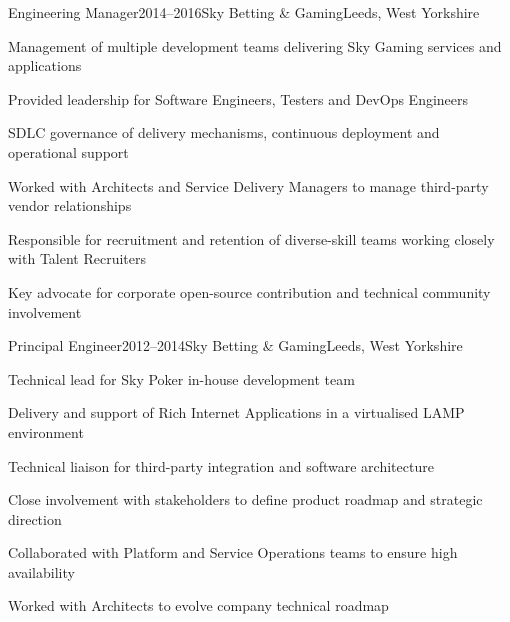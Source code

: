 \documentclass{cv}
\begin{document}

\begin{experience}{Engineering Manager}{2014--2016}{Sky Betting \& Gaming}{Leeds, West Yorkshire}
\item Management of multiple development teams delivering Sky Gaming services and applications
\item Provided leadership for Software Engineers, Testers and DevOps Engineers
\item SDLC governance of delivery mechanisms, continuous deployment and operational support
\item Worked with Architects and Service Delivery Managers to manage third-party vendor relationships
\item Responsible for recruitment and retention of diverse-skill teams working closely with Talent Recruiters
\item Key advocate for corporate open-source contribution and technical community involvement
\end{experience}


\begin{experience}{Principal Engineer}{2012--2014}{Sky Betting \& Gaming}{Leeds, West Yorkshire}
\item Technical lead for Sky Poker in-house development team
\item Delivery and support of Rich Internet Applications in a virtualised LAMP environment
\item Technical liaison for third-party integration and software architecture
\item Close involvement with stakeholders to define product roadmap and strategic direction
\item Collaborated with Platform and Service Operations teams to ensure high availability
\item Worked with Architects to evolve company technical roadmap
\end{experience}

\pagebreak

\end{document}
